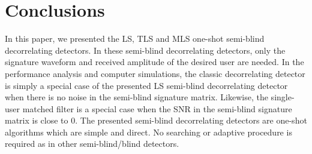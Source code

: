 \documentclass[10pt,fleqn,twocolumn]{IEEEtran}
\begin{document}
\section{Conclusions}

In this paper, we presented the LS, TLS and MLS one-shot
semi-blind decorrelating detectors. In these semi-blind
decorrelating detectors, only the signature waveform and received amplitude
of the desired user are needed.  In the performance analysis and computer
simulations, the classic decorrelating detector is simply a special case of
the presented LS semi-blind decorrelating detector when there is
no noise in the semi-blind signature matrix.  Likewise, the single-user
matched filter is a special case when the SNR in the semi-blind signature
matrix is close to $0$.  The presented semi-blind decorrelating detectors
are one-shot algorithms which are simple and direct.  No searching or
adaptive procedure is required as in other semi-blind/blind detectors.



\end{document}

